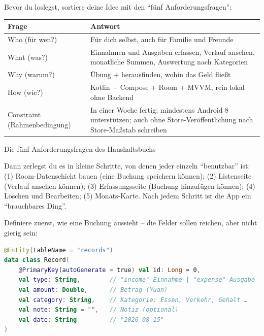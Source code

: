 


Bevor du loslegst, sortiere deine Idee mit den “fünf Anforderungsfragen”:

\begin{center}
\begin{tabularx}{\linewidth}{|X|X|}
\hline
\textbf{Frage} & \textbf{Antwort} \tabularnewline
\hline
Who (für wen?) & Für dich selbst, auch für Familie und Freunde \tabularnewline
What (was?) & Einnahmen und Ausgaben erfassen, Verlauf ansehen, monatliche Summen, Auswertung nach Kategorien \tabularnewline
Why (warum?) & Übung + herausfinden, wohin das Geld fließt \tabularnewline
How (wie?) & Kotlin + Compose + Room + MVVM, rein lokal ohne Backend \tabularnewline
Constraint (Rahmenbedingung) & In einer Woche fertig; mindestens Android 8 unterstützen; auch ohne Store-Veröffentlichung nach Store-Maßstab schreiben \tabularnewline
\hline
\end{tabularx}
\end{center}

\begin{center}\small\color{gray}Die fünf Anforderungsfragen des Haushaltsbuchs\end{center}

Dann zerlegst du es in kleine Schritte, von denen jeder einzeln “benutzbar” ist: (1) Room-Datenschicht bauen (eine Buchung speichern können); (2) Listenseite (Verlauf ansehen können); (3) Erfassungsseite (Buchung hinzufügen können); (4) Löschen und Bearbeiten; (5) Monats-Karte. Nach jedem Schritt ist die App ein “brauchbares Ding”.


Definiere zuerst, wie eine Buchung aussieht – die Felder sollen reichen, aber nicht gierig sein:

\begin{lstlisting}[language=Kotlin]
@Entity(tableName = "records")
data class Record(
    @PrimaryKey(autoGenerate = true) val id: Long = 0,
    val type: String,        // "income" Einnahme | "expense" Ausgabe
    val amount: Double,      // Betrag (Yuan)
    val category: String,    // Kategorie: Essen, Verkehr, Gehalt …
    val note: String = "",   // Notiz (optional)
    val date: String         // "2026-08-15"
)
\end{lstlisting}

